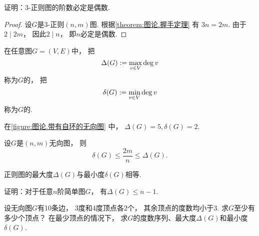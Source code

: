 \begin{example}
证明：\(3\)-正则图的阶数必定是偶数.
\begin{proof}
设\(G\)是\(3\)-正则\((n,m)\)图.
根据\cref{theorem:图论.握手定理} 有
\(3 n = 2 m\).
由于\(2 \mid 2 m\)，
因此\(2 \mid n\)，
即\(n\)必定是偶数.
\end{proof}
\end{example}

\begin{definition}
在任意图\(G = (V,E)\)中，
把\begin{equation*}
	\Delta(G)
	:=
	\max_{v \in V} \deg v
\end{equation*}称为\(G\)的，
把\begin{equation*}
	\delta(G)
	:=
	\min_{v \in V} \deg v
\end{equation*}称为\(G\)的.
\end{definition}

在\cref{figure:图论.带有自环的无向图} 中，
\(\Delta(G) = 5,
\delta(G) = 2\).

\begin{proposition}
设\(G\)是\((n,m)\)无向图，
则\begin{equation*}
	\delta(G)
	\leq
	\frac{2m}{n}
	\leq
	\Delta(G).
\end{equation*}
\end{proposition}

\begin{proposition}
正则图的最大度\(\Delta(G)\)与最小度\(\delta(G)\)相等.
\end{proposition}

\begin{example}
证明：对于任意\(n\)阶简单图\(G\)，
有\(\Delta(G) \leq n-1\).
\end{example}

\begin{example}
设无向图\(G\)有10条边，
3度和4度顶点各2个，
其余顶点的度数均小于3.
求\(G\)至少有多少个顶点？
在最少顶点的情况下，
求\(G\)的度数序列、最大度\(\Delta(G)\)和最小度\(\delta(G)\).
\end{example}


